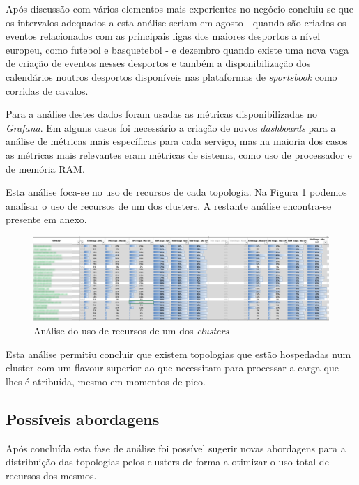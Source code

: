 Após discussão com vários elementos mais experientes no negócio concluiu-se que os intervalos
adequados a esta análise seriam em agosto - quando são criados os eventos relacionados com as
principais ligas dos maiores desportos a nível europeu, como futebol e basquetebol - e dezembro 
quando existe uma nova vaga de criação de eventos nesses desportos e também a disponibilização 
dos calendários noutros desportos disponíveis nas plataformas de \textit{sportsbook} como
corridas de cavalos.

Para a análise destes dados foram usadas as métricas disponibilizadas no \textit{Grafana}. Em alguns
casos foi necessário a criação de novos \textit{dashboards} para a análise de métricas mais 
específicas para cada serviço, mas na maioria dos casos as métricas mais relevantes eram métricas 
de sistema, como uso de processador e de memória RAM.

Esta análise foca-se no uso de recursos de cada topologia. Na Figura \ref{analise-ofs} podemos
analisar o uso de recursos de um dos \glspl{cluster}. A restante análise encontra-se
presente em anexo.


\begin{figure}[H]
  \centerline{\includegraphics[scale=0.3]{media/content/analise/analise-ofs.png}}
  \caption{Análise do uso de recursos de um dos \textit{clusters}}
  \label{analise-ofs}
\end{figure}

Esta análise permitiu concluir que existem topologias que estão hospedadas num \gls{cluster}
com um \gls{flavour} superior ao que necessitam para processar a carga que lhes é atribuída,
mesmo em momentos de pico. 

\subsection{Possíveis abordagens}

Após concluída esta fase de análise foi possível sugerir novas abordagens para a distribuição
das topologias pelos \glspl{cluster} de forma a otimizar o uso total de recursos dos mesmos.


